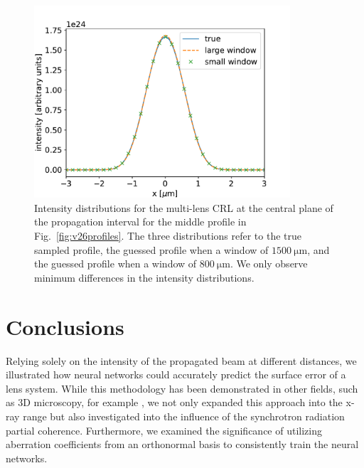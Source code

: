 \documentclass[preprint]{iucr}
\newcommand{\inred}[1]{{\color{red}#1}}
\begin{document}
\begin{figure}\label{fig:figure8}
\includegraphics[width=0.85\textwidth]{figures/figure8.pdf}

\caption{
Intensity distributions for the multi-lens CRL at the central plane of the propagation interval for the \inred{middle} profile in Fig.~\ref{fig:v26profiles}. The three distributions refer to the true sampled profile, the guessed profile when a window of $\SI{1500}{\micro\meter}$, and the guessed profile when a window of $\SI{800}{\micro\meter}$. We only observe  minimum differences in the intensity distributions.
    }
\end{figure}

\section{Conclusions}\label{sec:conclusions}

\inred{Relying solely on the intensity of the propagated beam at different distances, we illustrated how neural networks could accurately predict the surface error of a lens system. While this methodology has been demonstrated in other fields, such as 3D microscopy, for example \cite{Saha2020}, we not only expanded this approach into the x-ray range but also investigated into the influence of the synchrotron radiation partial coherence. Furthermore, we examined the significance of utilizing aberration coefficients from an orthonormal basis to consistently train the neural networks.}
\end{document}
